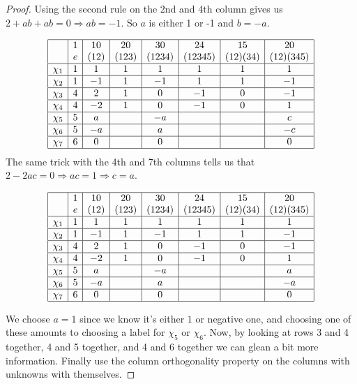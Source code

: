 \documentclass[11pt]{article}
\begin{document}
\begin{proof}
Using the second rule on the 2nd and 4th column gives us $2+ab+ab=0 \Rightarrow ab = -1$. So $a$ is either 1 or -1 and $b = -a$.

\[
\begin{array}{|c|c|c|c|c|c|c|c|}
\hline
&1&10&20&30&24&15&20\\
&e&(12)&(123)&(1234)&(12345)&(12)(34)&(12)(345)\\
\hline
\chi_1&1&1&1&1&1&1&1\\
\hline
\chi_2&1&-1&1&-1&1&1&-1\\
\hline
\chi_3&4&2&1&0&-1&0&-1\\
\hline
\chi_4&4&-2&1&0&-1&0&1\\
\hline
\chi_5&5&a&&-a&&&c\\
\hline
\chi_6&5&-a&&a&&&-c\\
\hline
\chi_7&6&0&&0&&&0\\
\hline
\end{array}\]
The same trick with the 4th and 7th columns tells us that $2-2ac=0 \Rightarrow ac=1 \Rightarrow c = a$.

\[
\begin{array}{|c|c|c|c|c|c|c|c|}
\hline
&1&10&20&30&24&15&20\\
&e&(12)&(123)&(1234)&(12345)&(12)(34)&(12)(345)\\
\hline
\chi_1&1&1&1&1&1&1&1\\
\hline
\chi_2&1&-1&1&-1&1&1&-1\\
\hline
\chi_3&4&2&1&0&-1&0&-1\\
\hline
\chi_4&4&-2&1&0&-1&0&1\\
\hline
\chi_5&5&a&&-a&&&a\\
\hline
\chi_6&5&-a&&a&&&-a\\
\hline
\chi_7&6&0&&0&&&0\\
\hline
\end{array}\]

We choose $a=1$ since we know it's either $1$ or negative one, and choosing one of these amounts to choosing a label for $\chi_5$ or $\chi_6$. Now, by looking at rows 3 and 4 together, 4 and 5 together, and 4 and 6 together we can glean a bit more information. Finally use the column orthogonality property on the columns with unknowns with themselves.



\end{proof}
\end{document}
